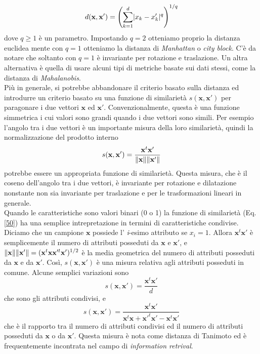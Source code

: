 \begin{equation}
d(\mathbf{x}, \mathbf{x}') = \left( \sum_{k=1}^d \lvert x_k - x_k'\rvert^q \right)^{1/q} 
\end{equation}
dove $q \geq 1$ è un parametro. Impostando $q=2$ otteniamo proprio la distanza euclidea mente con $q=1$ otteniamo la distanza di \emph{Manhattan} o \emph{city block}. C'è da notare che soltanto con $q=1$ è invariante per rotazione e traslazione. Un altra alternativa è quella di usare alcuni tipi di metriche basate sui dati stessi, come la distanza di \emph{Mahalanobis}.\\

\noindent Più in generale, si potrebbe abbandonare il criterio basato sulla distanza ed introdurre un criterio basato su una funzione di similarietà $s(\mathbf{x}, \mathbf{x}')$ per paragonare i due vettori $\mathbf{x}$ ed $\mathbf{x}'$. Convenzionalmente, questa è una funzione simmetrica i cui valori sono grandi quando i due vettori sono simili. Per esempio l'angolo tra i due vettori è un importante misura della loro similarietà, quindi la normalizzazione del prodotto interno
\begin{equation}\label{50}
s(\mathbf{x}, \mathbf{x}') = \frac{\mathbf{x}^t\mathbf{x}'}{\lVert\mathbf{x}\rVert \lVert\mathbf{x}'\rVert}
\end{equation}
potrebbe essere un appropriata funzione di similarietà. Questa misura, che è il coseno dell'angolo tra i due vettori, è invariante per rotazione e dilatazione nonstante non sia invariante per traslazione e per le trasformazioni lineari in generale. \\

\noindent Quando le caratteristiche sono valori binari (0 o 1) la funzione di similarietà (Eq. \ref{50}) ha una semplice intrepretazione in termini di caratteristiche condivise. Diciamo che un campione $\mathbf{x}$ possiede l' \emph{i}-esimo attributo se $x_i=1$. Allora $\mathbf{x}^t\mathbf{x}'$ è semplicemente il numero di attributi posseduti da $\mathbf{x}$ e $\mathbf{x}'$, e $\lVert\mathbf{x}\rVert \lVert\mathbf{x}'\rVert = (\mathbf{x}^t \mathbf{xx}'^t \mathbf{x}')^{1/2}$ è la media geometrica del numero di attributi posseduti da $\mathbf{x}$ e da $\mathbf{x}'$. Così, $s(\mathbf{x}, \mathbf{x}')$ è una misura relativa agli attributi posseduti in comune. Alcune semplici variazioni sono
\begin{equation}
s(\mathbf{x}, \mathbf{x}') = \frac{\mathbf{x}^t \mathbf{x}'}{d}
\end{equation}
che sono gli attributi condivisi, e
\begin{equation}
s(\mathbf{x}, \mathbf{x}') = \frac{\mathbf{x}^t \mathbf{x}'}{\mathbf{x}^t \mathbf{x} + \mathbf{x}'^t \mathbf{x}' - \mathbf{x}^t \mathbf{x}'} 
\end{equation}
che è il rapporto tra il numero di attributi condivisi ed il numero di attributi posseduti da $\mathbf{x}$ o da $\mathbf{x}'$. Questa misura è nota come distanza di Tanimoto ed è frequentemente incontrata nel campo di \emph{information retrival}.
 
